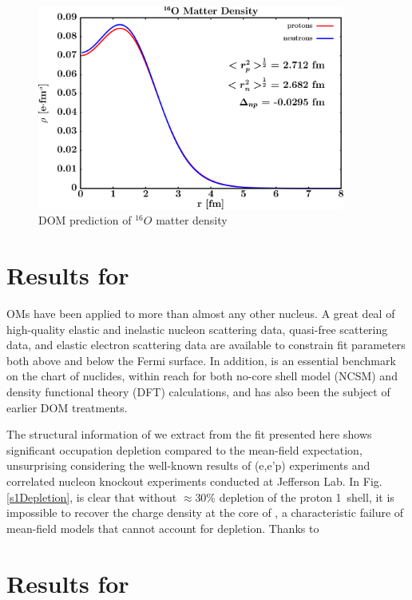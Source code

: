 \begin{figure}
\begin{center}
\includegraphics[width = 0.9\textwidth]{figures/o16_matterDensity.png}
\caption{DOM prediction of $^{16}O$ matter density}
\label{o16MatterDensity}
\end{center}
\end{figure}



\section{Results for \caAughtEight}
OMs have been applied to \caForty more than almost any other nucleus. A great deal of high-quality
elastic and inelastic nucleon scattering data, quasi-free scattering data, and elastic electron
scattering data are available to constrain fit parameters both above and below the Fermi surface. In
addition, \caForty is an essential benchmark on the chart of nuclides, within reach for both no-core
shell model (NCSM) and density functional theory (DFT) calculations, and has also been the subject
of earlier DOM treatments.

The structural information of \caForty we extract from the fit
presented here shows significant occupation depletion compared to the mean-field expectation,
unsurprising considering the well-known results of (e,e'p) experiments and correlated nucleon knockout
experiments conducted at Jefferson Lab. In Fig. \ref{s1Depletion}, is clear that without $\approx$30\%
depletion of the proton 1\sOne\ shell, it is impossible to recover the charge density at the core of
\caForty, a characteristic failure of mean-field models that cannot account for depletion. Thanks to 

\section{Results for \niEightFour}

